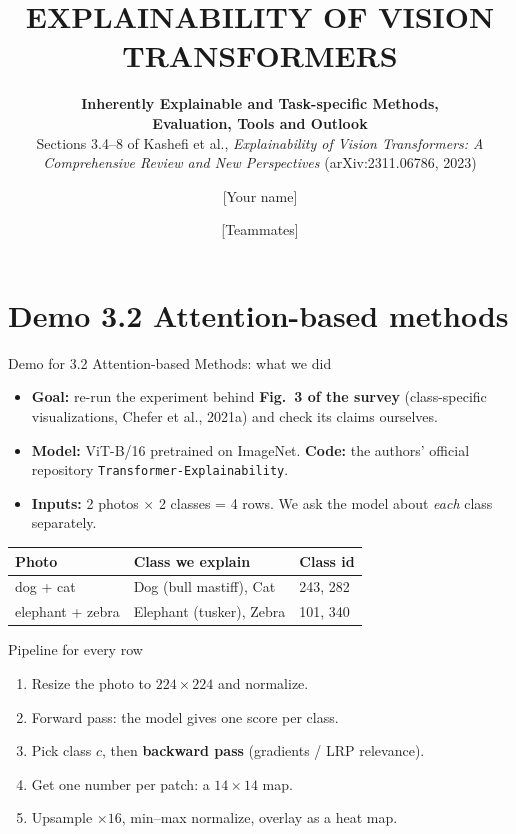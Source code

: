\documentclass[10pt]{beamer}
\title[XAI for ViTs: Sections 3.4--8]{\textbf{EXPLAINABILITY OF VISION TRANSFORMERS}}
\subtitle{\textbf{Inherently Explainable and Task-specific Methods,\\ Evaluation, Tools and Outlook}\\[2pt]
\scriptsize Sections 3.4--8 of Kashefi et al., \emph{Explainability of Vision Transformers: A Comprehensive Review and New Perspectives} (arXiv:2311.06786, 2023)}
\author[Group 6]{[Your name] \and [Teammates]}
\institute[Group 6]{University of Science - VNUHCM}
\date{}
\newcommand{\highlight}[1]{\textcolor{myNewColorA}{\textbf{#1}}}
\begin{document}
\frame{\titlepage}

\section{Demo 3.2 Attention-based methods}

\begin{frame}{Demo for 3.2 Attention-based Methods: what we did}
\begin{itemize}\small
  \item \textbf{Goal:} re-run the experiment behind \highlight{Fig.~3 of the survey} (class-specific visualizations, Chefer et al., 2021a) and check its claims ourselves.
  \item \textbf{Model:} ViT-B/16 pretrained on ImageNet. \textbf{Code:} the authors' official repository \texttt{Transformer-Explainability}.
  \item \textbf{Inputs:} 2 photos $\times$ 2 classes = 4 rows. We ask the model about \emph{each} class separately.
\end{itemize}
\vspace{0.1em}
\begin{center}\footnotesize
\begin{tabular}{L{2.8cm}L{3.8cm}L{1.6cm}}
\toprule
\textbf{Photo} & \textbf{Class we explain} & \textbf{Class id}\\
\midrule
dog + cat & Dog (bull mastiff), Cat & 243, 282\\
elephant + zebra & Elephant (tusker), Zebra & 101, 340\\
\bottomrule
\end{tabular}
\end{center}
\begin{block}{Pipeline for every row}
\footnotesize
\begin{enumerate}
  \item Resize the photo to $224\times224$ and normalize.
  \item Forward pass: the model gives one score per class.
  \item Pick class $c$, then \textbf{backward pass} (gradients / LRP relevance).
  \item Get one number per patch: a $14\times14$ map.
  \item Upsample $\times16$, min--max normalize, overlay as a heat map.
\end{enumerate}
\end{block}
\end{frame}
\end{document}
